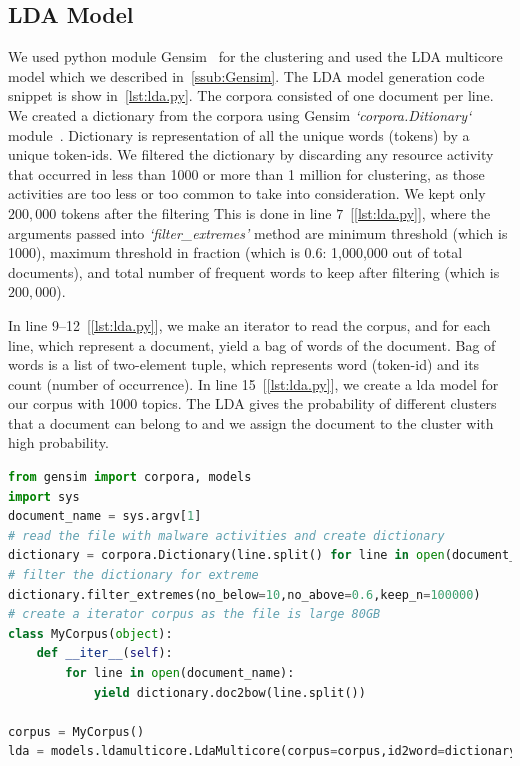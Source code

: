 \subsection{LDA Model}
\label{sub:LDA Model}
We used python module Gensim~\cite[Gensim]{gensim}  for the clustering and used the LDA multicore model which we described in~\autoref{ssub:Gensim}.
The LDA model generation code snippet is show in~\autoref{lst:lda.py}.
The corpora consisted of one document per line.
We created a dictionary from the corpora using Gensim \emph{`corpora.Ditionary`} module~\cite[]{gensimdict}.
Dictionary is representation of all the unique words (tokens) by a unique token-ids.
We filtered the dictionary by discarding any resource activity that occurred in less than 1000 or more than 1 million for clustering, as those activities are too less or too common to take into consideration.
We kept only $200,000$ tokens after the filtering 
This is done in line $7$~[\autoref{lst:lda.py}], where the arguments passed into \emph{`filter\_extremes'} method are minimum threshold (which is 1000), maximum threshold in fraction (which is $0.6$: 1,000,000 out of total \gettotalmalwareii{} documents), and total number of frequent words to keep after filtering (which is $200,000$).

In line 9--12~[\autoref{lst:lda.py}], we make an iterator to read the corpus, and for each line, which represent a document, yield a bag of words of the document.
Bag of words is a list of two-element tuple, which represents word (token-id) and its count (number of occurrence).
In line 15~[\autoref{lst:lda.py}], we create a lda model for our corpus with 1000 topics.
The LDA gives the probability of different clusters that a document can belong to and we assign the document to the cluster with high probability.\\
\begin{lstlisting}[float,floatplacement=H,language=python,caption={Script to run Gensim LDA},label={lst:lda.py}]
from gensim import corpora, models
import sys
document_name = sys.argv[1]
# read the file with malware activities and create dictionary
dictionary = corpora.Dictionary(line.split() for line in open(document_name))
# filter the dictionary for extreme
dictionary.filter_extremes(no_below=10,no_above=0.6,keep_n=100000)
# create a iterator corpus as the file is large 80GB
class MyCorpus(object):
    def __iter__(self):
        for line in open(document_name):
            yield dictionary.doc2bow(line.split())

corpus = MyCorpus()
lda = models.ldamulticore.LdaMulticore(corpus=corpus,id2word=dictionary,num_topics=1000)
\end{lstlisting}

